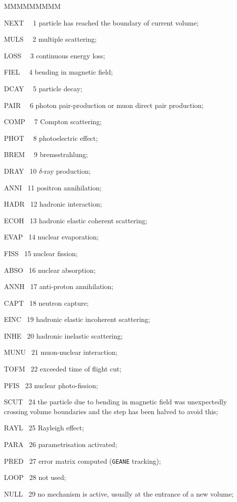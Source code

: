 \begin{DLtt}{MMMMMMMMM}
\item[NEXT ~~1] particle has reached the boundary of current volume;
\item[MULS ~~2] multiple scattering;
\item[LOSS ~~3] continuous energy loss;
\item[FIEL ~~4] bending in magnetic field;
\item[DCAY ~~5] particle decay;
\item[PAIR ~~6] photon pair-production or muon direct pair production;
\item[COMP ~~7] Compton scattering;
\item[PHOT ~~8] photoelectric effect;
\item[BREM ~~9] bremsstrahlung;
\item[DRAY ~10] $\delta$-ray production;
\item[ANNI ~11] positron annihilation;
\item[HADR ~12] hadronic interaction;
\item[ECOH ~13] hadronic elastic coherent scattering;
\item[EVAP ~14] nuclear evaporation;
\item[FISS ~15] nuclear fission;
\item[ABSO ~16] nuclear absorption;
\item[ANNH ~17] anti-proton annihilation;
\item[CAPT ~18] neutron capture;
\item[EINC ~19] hadronic elastic incoherent scattering;
\item[INHE ~20] hadronic inelastic scattering;
\item[MUNU ~21] muon-nuclear interaction;
\item[TOFM ~22] exceeded time of flight cut;
\item[PFIS ~23] nuclear photo-fission;
\item[SCUT ~24] the particle due to bending in magnetic field was 
unexpectedly crossing volume boundaries and the step has been halved to
avoid this;
\item[RAYL ~25] Rayleigh effect;
\item[PARA ~26] parametrisation activated;
\item[PRED ~27] error matrix computed ({\tt GEANE} tracking);
\item[LOOP ~28] not used;
\item[NULL ~29] no mechanism is active, usually at the entrance of
a new volume;

\end{DLtt}
